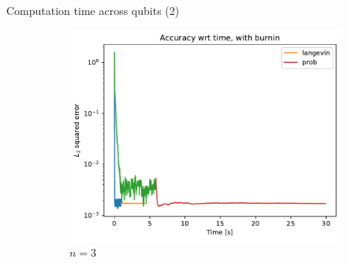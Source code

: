 \documentclass{beamer}
\begin{document}
\begin{frame}{Computation time across qubits (2)}
    
    \begin{figure}[H]

        \centering
    
        \begin{subfigure}[b]{0.4\textwidth}
    
    
            \centering
    
            \includegraphics[width=\textwidth]{figures/experiments/baseline/diff_n_qubits/iters_acc_comp_time_no_avg-1.png}
    
            \caption{$n=3$}
    
            \label{fig:conv-plot-diff-n-3-sub}
    
        \end{subfigure}
        \hfill
        \begin{subfigure}[b]{0.4\textwidth}
    
    
            \centering
    

\end{subfigure}
\end{figure}
\end{frame}
\end{document}

